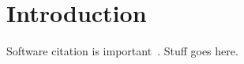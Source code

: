 \section{Introduction}\label{sec:introduction}
Software citation is important~\cite{ATLAS_Citation_Presentation}.
Stuff goes here.
